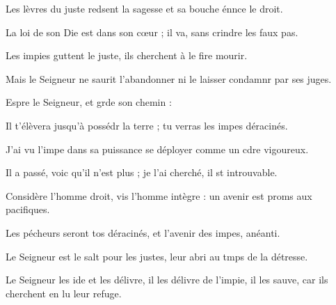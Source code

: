 \item Les lèvres du juste redsent la sagesse\psstar{} et sa bouche énnce le droit.
\item La loi de son Die est dans son cœur ;\psstar{} il va, sans crindre les faux pas.
\item Les impies guttent le juste,\psstar{} ils cherchent à le fire mourir.
\item Mais le Seigneur ne saurit l’abandonner\psstar{} ni le laisser condamnr par ses juges.
\item Espre le Seigneur,\psstar{} et grde son chemin :
\item Il t’élèvera jusqu’à possédr la terre ;\psstar{} tu verras les impes déracinés.
\item J’ai vu l’impe dans sa puissance\psstar{} se déployer comme un cdre vigoureux.
\item Il a passé, voic qu’il n’est plus ;\psstar{} je l’ai cherché, il st introuvable.
\item Considère l’homme droit, vis l’homme intègre :\psstar{} un avenir est proms aux pacifiques.
\item Les pécheurs seront tos déracinés,\psstar{} et l’avenir des impes, anéanti.
\item Le Seigneur est le salt pour les justes,\psstar{} leur abri au tmps de la détresse.
\item Le Seigneur les ide et les délivre,\psstar{} il les délivre de l’impie, il les sauve, car ils cherchent en lu leur refuge.